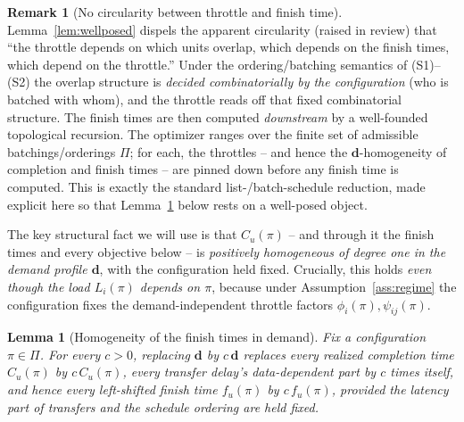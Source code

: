 \documentclass{amsart}
\newtheorem{lemma}{Lemma}
\theoremstyle{definition}
\newtheorem{remark}{Remark}
\begin{document}
\begin{remark}[No circularity between throttle and finish time]\label{rem:nocirc}
Lemma~\ref{lem:wellposed} dispels the apparent circularity (raised in review)
that ``the throttle depends on which units overlap, which depends on the finish
times, which depend on the throttle.'' Under the ordering/batching semantics of
(S1)--(S2) the overlap structure is \emph{decided combinatorially by the
configuration} (who is batched with whom), and the throttle reads off that fixed
combinatorial structure. The finish times are then computed \emph{downstream} by
a well-founded topological recursion. The optimizer ranges over the finite set of
admissible batchings/orderings $\Pi$; for each, the throttles -- and hence the
$\mathbf d$-homogeneity of completion and finish times -- are pinned down before
any finish time is computed. This is exactly the standard list-/batch-schedule
reduction, made explicit here so that Lemma~\ref{lem:homog} below rests on a
well-posed object.
\end{remark}

The key structural fact we will use is that $C_u(\pi)$ -- and through it the
finish times and every objective below -- is \emph{positively homogeneous of
degree one in the demand profile $\mathbf d$}, with the configuration held
fixed. Crucially, this holds \emph{even though the load $L_i(\pi)$ depends on
$\pi$}, because under Assumption~\ref{ass:regime} the configuration fixes the
demand-independent throttle factors $\phi_i(\pi),\psi_{ij}(\pi)$.

\begin{lemma}[Homogeneity of the finish times in demand]\label{lem:homog}
Fix a configuration $\pi\in\Pi$. For every $c>0$, replacing $\mathbf d$ by
$c\,\mathbf d$ replaces every realized completion time $C_u(\pi)$ by
$c\,C_u(\pi)$, every transfer delay's data-dependent part by $c$ times itself,
and hence every left-shifted finish time $f_u(\pi)$ by $c\,f_u(\pi)$, provided
the latency part of transfers and the schedule \emph{ordering} are held fixed.
\end{lemma}
\end{document}
